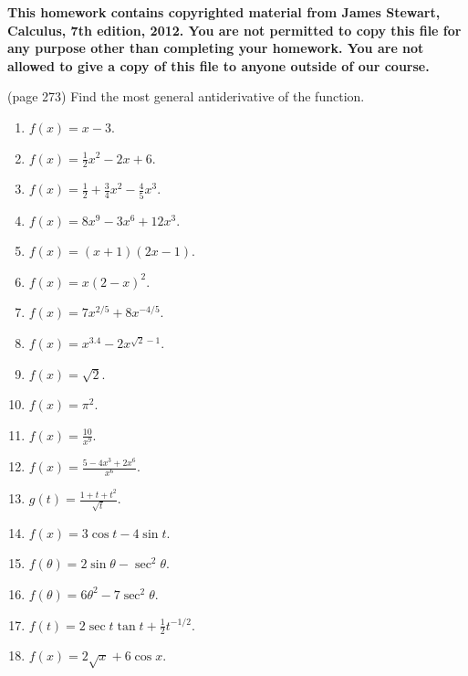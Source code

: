 \textbf{This homework contains copyrighted material from  James Stewart, Calculus, 7th edition, 2012. 
You are not permitted to copy this file for any purpose other than completing your homework. You are not allowed to give a copy of this file to anyone outside of our course. 
}

\begin{problem}(page 273)
Find the most general antiderivative of the function.
\begin{multicols}{3}
\begin{enumerate}
\item $f(x)=x-3$.
\item $f(x)=\frac12 x^2-2x+6$.

\item $f(x)=\frac12 +\frac34x^2-\frac45x^3$.
\item $f(x)=8x^9-3x^6+12x^3$.

\item $f(x)=(x+1)(2x-1)$.
\item $f(x)=x(2-x)^2$.

\item $f(x)=7x^{2/5}+8x^{-4/5}$.
\item $f(x)=x^{3.4}-2x^{\sqrt{2}-1}$.

\item $f(x)=\sqrt {2}$.
\item $f(x)=\pi^2$.

\item $f(x)=\frac{10}{x^9}$.
\item $f(x)=\frac{5-4x^3+2x^6}{x^6}$.

\item $g(t)=\frac{1+t+t^2}{\sqrt{t}}$.
\item $f(x)=3\cos t-4\sin t$.

\item $f(\theta)=2\sin \theta-\sec^2\theta$.
\item $f(\theta)=6\theta^2-7\sec^2\theta$.

\item $f(t)=2\sec t \tan t +\frac12 t^{-1/2}$.
\item $f(x)=2\sqrt{x}+6\cos x$.

\end{enumerate}
\end{multicols}

\end{problem}